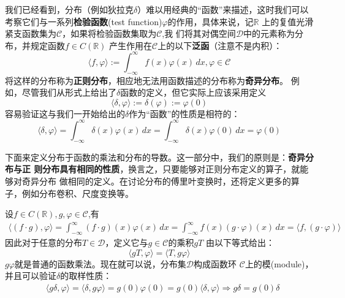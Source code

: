 \documentclass{ctexbook}
\begin{document}
我们已经看到，分布（例如狄拉克$\delta$）难以用经典的“函数”来描述，这时我们可以
考察它们与一系列\textbf{检验函数}(test function)$\varphi$的作用，具体来说，记$\mathbb{R}$
上的复值光滑紧支函数集为$\mathcal{C} $，如果将检验函数集取为$\mathcal{C}$,我
们将其对偶空间$\mathcal{D} $中的元素称为分布，并规定函数$f\in C(\mathbb{R})$
产生作用在$\mathcal{C}$上的以下\textbf{泛函}（注意不是内积）：
\begin{equation}
    \langle f,\varphi\rangle:=\int_{-\infty}^{\infty}f(x)\varphi(x)\,dx,\varphi\in\mathcal{C}
\end{equation}
将这样的分布称为\textbf{正则分布}，相应地无法用函数描述的分布称为\textbf{奇异分布}。
例如，尽管我们从形式上给出了$\delta$函数的定义，但它实际上应该采用定义
\[\langle \delta,\varphi\rangle:=\delta(\varphi):=\varphi(0)\]
容易验证这与我们一开始给出的$\delta$作为“函数”的性质是相符的：
\[\langle \delta,\varphi\rangle=\int_{-\infty}^{\infty}\delta(x)\varphi(x)\,dx=\int_{-\infty}^{\infty}\delta(x)\varphi(0)\,dx=\varphi(0)\]

下面来定义分布于函数的乘法和分布的导数。这一部分中，我们的原则是：\textbf{奇异分布与正
    则分布具有相同的性质}，换言之，只要能够对正则分布定义的算子，就能够对奇异分布
做相同的定义。在讨论分布的傅里叶变换时，还将定义更多的算子，例如分布卷积、尺度变换等。

设$f\in C(\mathbb{R}),g,\varphi\in\mathcal{C} $,有
\begin{align*}
    \langle (f\cdot g),\varphi\rangle=\int_{-\infty}^{\infty}(f\cdot g)(x)\varphi(x)\,dx=\int_{-\infty}^{\infty}f(x)(g\cdot\varphi)(x)\,dx=\langle f,(g\cdot\varphi)\rangle
\end{align*}
因此对于任意的分布$T\in\mathcal{D} $，定义它与$g\in\mathcal{C} $的乘积$gT$
由以下等式给出：
\begin{equation}
    \langle gT,\varphi\rangle=\langle T,g\varphi\rangle
\end{equation}
$g\varphi$就是普通的函数乘法。现在就可以说，分布集$\mathcal{D} $构成函数环
$\mathcal{C} $上的模(module)，并且可以验证$\delta$的取样性质：
\begin{align*}
     & \langle g\delta,\varphi\rangle=\langle \delta,g\varphi\rangle=g(0)\varphi(0)=g(0)\langle\delta,\varphi\rangle \Rightarrow  g\delta=g(0)\delta
\end{align*}
\end{document}
